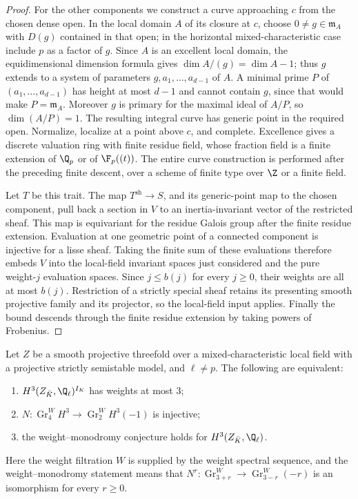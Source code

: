 \begin{proof}
For the other components we construct a curve approaching $c$ from
the chosen dense open.  In the local domain $A$ of its closure at
$c$, choose $0\ne g\in\mathfrak m_A$ with $D(g)$ contained in
that open; in the horizontal mixed-characteristic case include $p$
as a factor of $g$.  Since $A$ is an excellent local domain,
the equidimensional dimension formula gives
$\dim A/(g)=\dim A-1$; thus $g$ extends to a system of parameters
$g,a_1,\ldots,a_{d-1}$ of $A$.  A minimal prime $P$ of
$(a_1,\ldots,a_{d-1})$ has height at most $d-1$ and cannot
contain $g$, since that would make $P=\mathfrak m_A$.
Moreover $g$ is primary for the maximal ideal of $A/P$, so
$\dim(A/P)=1$.  The resulting integral curve has generic point
in the required open.  Normalize, localize at a point above $c$,
and complete.  Excellence gives a discrete valuation ring with
finite residue field, whose fraction field is a finite extension
of $\Q_p$ or of $\F_p((t))$.  The entire curve construction is
performed after the preceding finite descent, over a scheme of
finite type over $\Z$ or a finite field.

Let $T$ be this trait.  The map $T^{\mathrm{sh}}\to S$, and its
generic-point map to the chosen component, pull back a section in
$V$ to an inertia-invariant vector of the restricted sheaf.
This map is equivariant for the residue Galois group after the
finite residue extension.  Evaluation at one geometric point of
a connected component is injective for a lisse sheaf.  Taking
the finite sum of these evaluations therefore embeds $V$ into
the local-field invariant spaces just considered and the pure
weight-$j$ evaluation spaces.  Since $j\leq b(j)$ for every
$j\geq0$, their weights are all at most $b(j)$.
Restriction of a strictly special sheaf retains its presenting
smooth projective family and its projector, so the local-field
input applies.  Finally the bound descends through the finite
residue extension by taking powers of Frobenius.
\end{proof}

\begin{corollary}
\label{c:threefold-weight-gate}
Let $Z$ be a smooth projective threefold over a mixed-characteristic
local field with a projective strictly semistable model, and
$\ell\ne p$.  The following are equivalent:
\begin{enumerate}[label=(\roman*)]
\item $H^3(Z_{\bar K},\Q_\ell)^{I_K}$ has weights at most $3$;
\item $N:\operatorname{Gr}^W_4H^3\to
       \operatorname{Gr}^W_2H^3(-1)$ is injective;
\item the weight--monodromy conjecture holds for $H^3(Z_{\bar K},\Q_\ell)$.
\end{enumerate}
Here the weight filtration $W$ is supplied by the weight spectral
sequence, and the weight--monodromy statement means that
$N^r:\operatorname{Gr}^W_{3+r}\to
\operatorname{Gr}^W_{3-r}(-r)$ is an isomorphism for every $r\geq0$.
\end{corollary}


